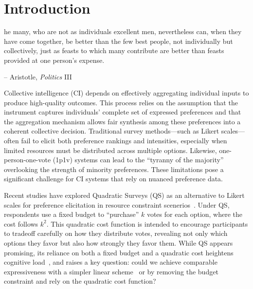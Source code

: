 \section{Introduction}

\begin{displayquote}
[T]he many, who are not as individuals excellent men, nevertheless can, when they have come together, be better than the few best people, not individually but collectively, just as feasts to which many contribute are better than feasts provided at one person's expense.

\begin{flushright}
-- Aristotle, \textit{Politics} III
\end{flushright}
\end{displayquote}

Collective intelligence (CI) depends on effectively aggregating individual inputs to produce high-quality outcomes. This process relies on the assumption that the instrument captures individuals' complete set of expressed preferences and that the aggregation mechanism allows fair synthesis among these preferences into a coherent collective decision. Traditional survey methods---such as Likert scales---often fail to elicit both preference rankings and intensities, especially when limited resources must be distributed across multiple options. Likewise, one-person-one-vote (1p1v) systems can lead to the ``tyranny of the majority'' overlooking the strength of minority preferences. These limitations pose a significant challenge for CI systems that rely on nuanced preference data.

Recent studies have explored Quadratic Surveys (QS) as an alternative to Likert scales for preference elicitation in resource constraint scenerios~\cite{chengCanShowWhat2021, quarfoot2017quadratic, cavaille2024cares}. Under QS, respondents use a fixed budget to ``purchase'' $k$ votes for each option, where the cost follows $k^2$. This quadratic cost function is intended to encourage participants to tradeoff carefully on how they distribute votes, revealing not only which options they favor but also how strongly they favor them. While QS appears promising, its reliance on both a fixed budget and a quadratic cost heightens cognitive load~\cite{chengOrganizeThenVote2025}, and raises a key question: could we achieve comparable expressiveness with a simpler linear scheme~\cite{quarfoot2017quadratic, chengCanShowWhat2021, cavaille2024cares} or by removing the budget constraint and rely on the quadratic cost function?


